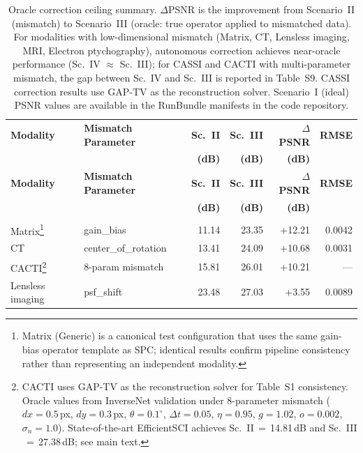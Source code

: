 \documentclass[11pt]{article}
\theoremstyle{definition}
\begin{document}
\begin{longtable}{>{\raggedright}p{2.0cm} >{\raggedright}p{2.8cm}
                  r r r r}
\caption{Oracle correction ceiling summary.  $\Delta$PSNR is the
improvement from Scenario~II (mismatch) to Scenario~III (oracle: true operator applied to mismatched data).
For modalities with low-dimensional mismatch (Matrix, CT, Lensless imaging, MRI, Electron ptychography), autonomous correction achieves near-oracle performance (Sc.~IV $\approx$ Sc.~III); for CASSI and CACTI with multi-parameter mismatch, the gap between Sc.~IV and Sc.~III is reported in Table~S9. CASSI correction results use GAP-TV as the reconstruction solver.
Scenario~I (ideal) PSNR values are available in the RunBundle manifests in the code repository.}
\label{tab:correction_params} \\
\toprule
\textbf{Modality} & \textbf{Mismatch Parameter} &
  \textbf{Sc.~II} & \textbf{Sc.~III} &
  \textbf{$\Delta$PSNR} & \textbf{RMSE} \\
  & & \textbf{(dB)} & \textbf{(dB)} & \textbf{(dB)} & \\
\midrule
\endfirsthead
\toprule
\textbf{Modality} & \textbf{Mismatch Parameter} &
  \textbf{Sc.~II} & \textbf{Sc.~III} &
  \textbf{$\Delta$PSNR} & \textbf{RMSE} \\
  & & \textbf{(dB)} & \textbf{(dB)} & \textbf{(dB)} & \\
\midrule
\endhead
\midrule
\multicolumn{6}{r}{\emph{Continued on next page}} \\
\endfoot
\bottomrule
\endlastfoot
Matrix\footnote{Matrix (Generic) is a canonical test configuration that uses the same gain-bias operator template as SPC; identical results confirm pipeline consistency rather than representing an independent modality.}
  & gain\_bias
  & 11.14 & 23.35 & +12.21
  & 0.0042 \\
CT
  & center\_of\_rotation
  & 13.41 & 24.09 & +10.68
  & 0.0031 \\
CACTI\footnote{CACTI uses GAP-TV as the reconstruction solver for Table~S1 consistency.  Oracle values from InverseNet validation under 8-parameter mismatch ($dx{=}0.5$\,px, $dy{=}0.3$\,px, $\theta{=}0.1^\circ$, $\Delta t{=}0.05$, $\eta{=}0.95$, $g{=}1.02$, $o{=}0.002$, $\sigma_n{=}1.0$).  State-of-the-art EfficientSCI achieves Sc.~II$\,=\,$14.81\,dB and Sc.~III$\,=\,$27.38\,dB; see main text.}
  & 8-param mismatch
  & 15.81 & 26.01 & +10.21
  & --- \\
Lensless imaging
  & psf\_shift
  & 23.48 & 27.03 & +3.55
  & 0.0089 \\

\end{longtable}
\end{document}

